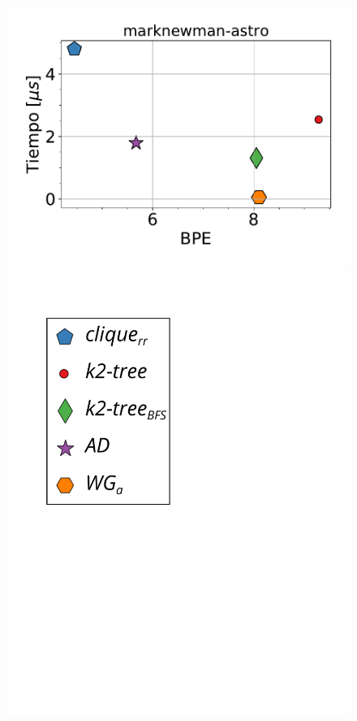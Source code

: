 \begin{figure}
    	\centering
    	\begin{minipage}{1\textwidth}
    		\centering
    		\begin{minipage}{0.45\textwidth}
    			\centering
    			\begin{minipage}{0.75\textwidth}
    				\centering
    				\includegraphics[width=1\linewidth]{img/bpeTimes/aleatorio/marknewman-astro.pdf}
    			\end{minipage}
    			\begin{minipage}{0.2\textwidth}
    				\centering
    				\includegraphics[scale=.2, clip, trim=60 194 0 0]{img/bpeTimes/labelAle.pdf}
    			\end{minipage}
    			

\end{minipage}
\end{minipage}
\end{figure}
